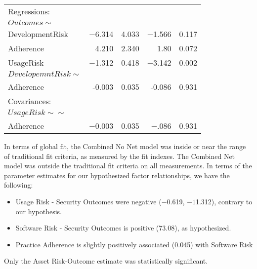 \begin{table}
\begin{center}
\begin{tabular}{l|rrrr}
			Regressions:  & & & & \\  
			$Outcomes \sim$         & & & & \\                                     
			DevelopmentRisk   &  $-$6.314 &   4.033 & $-$1.566 &   0.117 \\
			Adherence       &  4.210  & 2.340  &  1.80  &  0.072\\
			UsageRisk     &   $-$1.312  &  0.418  &  $-$3.142 &   0.002\\
			$DevelopemntRisk \sim$        & & & & \\                                  
			Adherence     &    -0.003 &   0.035  &  -0.086 &   0.931\\
			Covariances:  & & & & \\  
			$UsageRisk \sim\sim$          & & & & \\                                 
			Adherence     &    $-$0.003 &   0.035  &  $-$.086 &   0.931\\
		\end{tabular}
	\end{center}
\end{table}

In terms of global fit, the Combined No Net model was inside or near the range of traditional fit criteria, as measured by the fit indexes. The Combined Net model was outside the traditional fit criteria on all measurements. In terms of the parameter estimates for our hypothesized factor relationships, we have the following:
\begin{itemize}
	\item  Usage Risk - Security Outcomes were negative ($-$0.619, $-1$1.312), contrary to our hypothesis. 
	\item Software Risk - Security Outcomes is positive (73.08), as hypothesized. 
	\item Practice Adherence is slightly positively associated (0.045) with Software Risk 
\end{itemize}	
Only the Asset Risk-Outcome estimate was statistically significant.